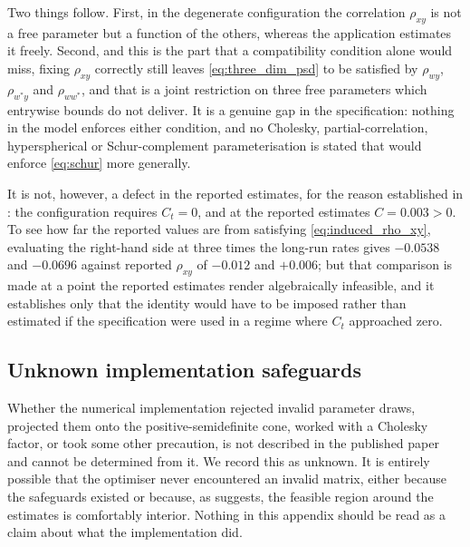 \documentclass[11pt]{article}
\theoremstyle{definition}
\begin{document}
Two things follow. First, in the degenerate configuration the correlation $\rho_{xy}$ is not a free parameter but a function of the others, whereas the application estimates it freely. Second, and this is the part that a compatibility condition alone would miss, fixing $\rho_{xy}$ correctly still leaves \eqref{eq:three_dim_psd} to be satisfied by $\rho_{wy}$, $\rho_{w^*y}$ and $\rho_{ww^*}$, and that is a joint restriction on three free parameters which entrywise bounds do not deliver. It is a genuine gap in the specification: nothing in the model enforces either condition, and no Cholesky, partial-correlation, hyperspherical or Schur-complement parameterisation is stated that would enforce \eqref{eq:schur} more generally.

It is not, however, a defect in the reported estimates, for the reason established in : the configuration requires $C_t=0$, and at the reported estimates $C=0.003>0$. To see how far the reported values are from satisfying \eqref{eq:induced_rho_xy}, evaluating the right-hand side at three times the long-run rates gives $-0.0538$ and $-0.0696$ against reported $\rho_{xy}$ of $-0.012$ and $+0.006$; but that comparison is made at a point the reported estimates render algebraically infeasible, and it establishes only that the identity would have to be imposed rather than estimated if the specification were used in a regime where $C_t$ approached zero.

\subsection{Unknown implementation safeguards}\label{app:psd_implementation}

Whether the numerical implementation rejected invalid parameter draws, projected them onto the positive-semidefinite cone, worked with a Cholesky factor, or took some other precaution, is not described in the published paper and cannot be determined from it. We record this as unknown. It is entirely possible that the optimiser never encountered an invalid matrix, either because the safeguards existed or because, as  suggests, the feasible region around the estimates is comfortably interior. Nothing in this appendix should be read as a claim about what the implementation did.
\end{document}
